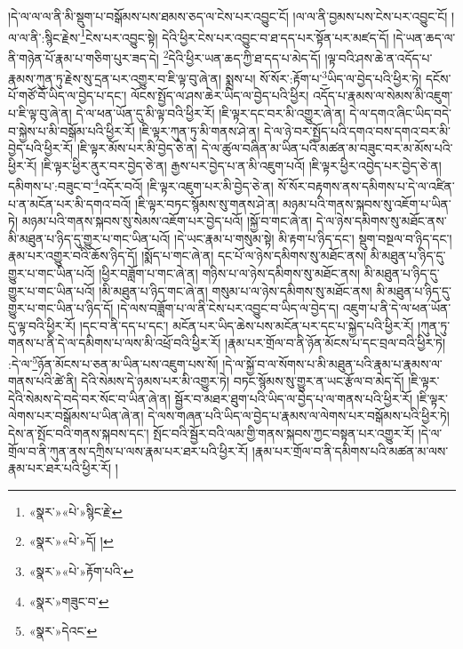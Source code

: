 །དེ་ལ་ལ་ལ་ནི་མི་སྡུག་པ་བསྒོམས་པས་ཐམས་ཅད་ལ་ངེས་པར་འབྱུང་ངོ། །ལ་ལ་ནི་བྱམས་པས་ངེས་པར་འབྱུང་ངོ། །ལ་ལ་ནི་:སྙིང་རྗེས་\footnote{«སྣར་»«པེ་»སྙིང་རྗེ་}ངེས་པར་འབྱུང་སྟེ། དེའི་ཕྱིར་ངེས་པར་འབྱུང་བ་ཐ་དད་པར་སྟོན་པར་མཛད་དོ། །དེ་ཡན་ཆད་ལ་ནི་གཉེན་པོ་རྣམ་པ་གཅིག་པུར་ཟད་དེ། \footnote{«སྣར་»«པེ་»དོ། ། }དེའི་ཕྱིར་ཡན་ཆད་ཀྱི་ཐ་དད་པ་མེད་དོ། །ལྟ་བའི་ཤས་ཆེ་ན་འདོད་པ་རྣམས་ཀུན་ཏུ་རྗེས་སུ་དྲན་པར་འགྱུར་བ་ཇི་ལྟ་བུ་ཞེ་ན། སྨྲས་པ། སོ་སོར་:རྟོག་པ་\footnote{«སྣར་»«པེ་»རྟོག་པའི་}ཡིད་ལ་བྱེད་པའི་ཕྱིར་ཏེ། དངོས་པོ་གཙོ་བོ་ཡིད་ལ་བྱེད་པ་དང་། ལོངས་སྤྱོད་ལ་ཤས་ཆེར་ཡིད་ལ་བྱེད་པའི་ཕྱིར། འདོད་པ་རྣམས་ལ་སེམས་མི་འཇུག་པ་ཇི་ལྟ་བུ་ཞེ་ན། དེ་ལ་ཕན་ཡོན་དུ་མི་ལྟ་བའི་ཕྱིར་རོ། །ཇི་ལྟར་དང་བར་མི་འགྱུར་ཞེ་ན། དེ་ལ་དགའ་ཞིང་ཡིད་བདེ་བ་སྐྱེས་པ་མི་བསྒོམ་པའི་ཕྱིར་རོ། །ཇི་ལྟར་ཀུན་ཏུ་མི་གནས་ཤེ་ན། དེ་ལ་ཉེ་བར་སྤྱོད་པའི་དགའ་བས་དགའ་བར་མི་བྱེད་པའི་ཕྱིར་རོ། །ཇི་ལྟར་མོས་པར་མི་བྱེད་ཅེ་ན། དེ་ལ་ཚུལ་བཞིན་མ་ཡིན་པའི་མཚན་མ་བཟུང་བར་མ་མོས་པའི་ཕྱིར་རོ། །ཇི་ལྟར་ཕྱིར་ནུར་བར་བྱེད་ཅེ་ན། རྒྱས་པར་བྱེད་པ་ན་མི་འཇུག་པའོ། །ཇི་ལྟར་ཕྱིར་འབྱེད་པར་བྱེད་ཅེ་ན། དམིགས་པ་:བཟུང་བ་\footnote{«སྣར་»གཟུང་བ་}འདོར་བའོ། །ཇི་ལྟར་འཇུག་པར་མི་བྱེད་ཅེ་ན། སོ་སོར་བརྟགས་ནས་དམིགས་པ་དེ་ལ་འཛིན་པ་ན་མངོན་པར་མི་དགའ་བའོ། །ཇི་ལྟར་བཏང་སྙོམས་སུ་གནས་ཤེ་ན། མཉམ་པའི་གནས་སྐབས་སུ་འཇོག་པ་ཡིན་ཏེ། མཉམ་པའི་གནས་སྐབས་སུ་སེམས་འཇོག་པར་བྱེད་པའོ། །སྐྱོ་བ་གང་ཞེ་ན། དེ་ལ་ཉེས་དམིགས་སུ་མཐོང་ནས་མི་མཐུན་པ་ཉིད་དུ་གྱུར་པ་གང་ཡིན་པའོ། །དེ་ཡང་རྣམ་པ་གསུམ་སྟེ། མི་རྟག་པ་ཉིད་དང་། སྡུག་བསྔལ་བ་ཉིད་དང་། རྣམ་པར་འགྱུར་བའི་ཆོས་ཉིད་དོ། །སྨོད་པ་གང་ཞེ་ན། དང་པོ་ལ་ཉེས་དམིགས་སུ་མཐོང་ནས། མི་མཐུན་པ་ཉིད་དུ་གྱུར་པ་གང་ཡིན་པའོ། །ཕྱིར་བཟློག་པ་གང་ཞེ་ན། གཉིས་པ་ལ་ཉེས་དམིགས་སུ་མཐོང་ནས། མི་མཐུན་པ་ཉིད་དུ་གྱུར་པ་གང་ཡིན་པའོ། །མི་མཐུན་པ་ཉིད་གང་ཞེ་ན། གསུམ་པ་ལ་ཉེས་དམིགས་སུ་མཐོང་ནས། མི་མཐུན་པ་ཉིད་དུ་གྱུར་པ་གང་ཡིན་པ་ཉིད་དོ། །དེ་ལས་བཟློག་པ་ལ་ནི་ངེས་པར་འབྱུང་བ་ཡིད་ལ་བྱེད་ད། འཇུག་པ་ནི་དེ་ལ་ཕན་ཡོན་དུ་ལྟ་བའི་ཕྱིར་རོ། །དང་བ་ནི་དད་པ་དང་། མངོན་པར་ཡིད་ཆེས་པས་མངོན་པར་དང་པ་སྐྱེད་པའི་ཕྱིར་རོ། །ཀུན་ཏུ་གནས་པ་ནི་དེ་ལ་དམིགས་པ་ལས་མི་འཕྲོ་བའི་ཕྱིར་རོ། །རྣམ་པར་གྲོལ་བ་ནི་ཉོན་མོངས་པ་དང་བྲལ་བའི་ཕྱིར་ཏེ། :དེ་ལ་\footnote{«སྣར་»དེའང་}ཉོན་མོངས་པ་ཅན་མ་ཡིན་པས་འཇུག་པས་སོ། །དེ་ལ་སྐྱོ་བ་ལ་སོགས་པ་མི་མཐུན་པའི་རྣམ་པ་རྣམས་ལ་གནས་པའི་ཚེ་ནི། དེའི་སེམས་དེ་ཉམས་པར་མི་འགྱུར་ཏེ། བཏང་སྙོམས་སུ་གྱུར་ན་ཡང་རྩོལ་བ་མེད་དོ། །ཇི་ལྟར་དེའི་སེམས་དེ་བདེ་བར་སོང་བ་ཡིན་ཞེ་ན། སྦྱོར་བ་མཐར་ཐུག་པའི་ཡིད་ལ་བྱེད་པ་ལ་གནས་པའི་ཕྱིར་རོ། །ཇི་ལྟར་ལེགས་པར་བསྒོམས་པ་ཡིན་ཞེ་ན། དེ་ལས་གཞན་པའི་ཡིད་ལ་བྱེད་པ་རྣམས་ལ་ལེགས་པར་བསྒོམས་པའི་ཕྱིར་ཏེ། དེས་ན་སྤོང་བའི་གནས་སྐབས་དང་། སྤོང་བའི་སྦྱོར་བའི་ལམ་གྱི་གནས་སྐབས་ཀྱང་བསྟན་པར་འགྱུར་རོ། །དེ་ལ་གྲོལ་བ་ནི་ཀུན་ནས་དཀྲིས་པ་ལས་རྣམ་པར་ཐར་པའི་ཕྱིར་རོ། །རྣམ་པར་གྲོལ་བ་ནི་དམིགས་པའི་མཚན་མ་ལས་རྣམ་པར་ཐར་པའི་ཕྱིར་རོ། །
